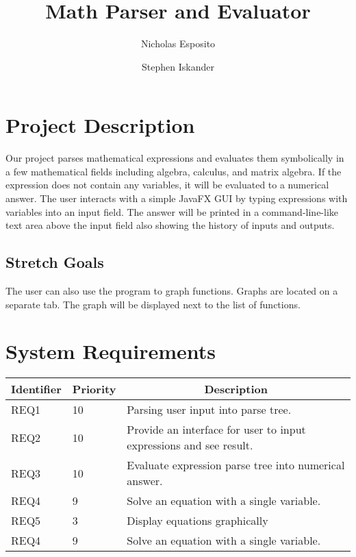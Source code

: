 \documentclass[letterpaper]{article}
\begin{document}
\title{\textbf{Math Parser and Evaluator}}
\author{Nicholas Esposito \and Stephen Iskander}

\maketitle

\section{Project Description}
Our project parses mathematical expressions and evaluates them symbolically in a few mathematical fields including algebra, calculus, and matrix algebra.
If the expression does not contain any variables, it will be evaluated to a numerical answer.
The user interacts with a simple JavaFX GUI by typing expressions with variables into an input field.
The answer will be printed in a command-line-like text area above the input field also showing the history of inputs and outputs.

\subsection{Stretch Goals}
The user can also use the program to graph functions.
Graphs are located on a separate tab.
The graph will be displayed next to the list of functions.


\section{System Requirements}

\begin{tabular}{|l|l|l|}
\hline
\multicolumn{1}{|c|}{\textbf{Identifier}} & \multicolumn{1}{c|}{\textbf{Priority}} & \multicolumn{1}{c|}{\textbf{Description}} \\ \hline
REQ1 & 10 & Parsing user input into parse tree. \\ \hline
REQ2 & 10 & Provide an interface for user to input expressions and see result.\\ \hline
REQ3 & 10 & Evaluate expression parse tree into numerical answer. \\ \hline
REQ4 & 9  & Solve an equation with a single variable. \\ \hline
REQ5 & 3  & Display equations graphically \\ \hline
REQ4 & 9  & Solve an equation with a single variable. \\ \hline
\end{tabular}
\end{document}
